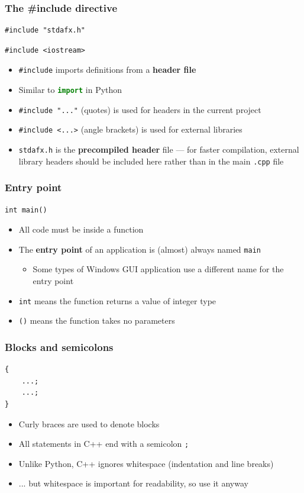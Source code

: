 \begin{frame}[fragile]
	\frametitle{The \#include directive}
	\begin{lstlisting}
#include "stdafx.h"
	\end{lstlisting}
	\begin{lstlisting}
#include <iostream>
	\end{lstlisting}
	\pause
	\begin{itemize}
		\item \lstinline{#include} imports definitions from a \textbf{header file} \pause
		\item Similar to \lstinline[language=Python]{import} in Python \pause
		\item \lstinline{#include "..."} (quotes) is used for headers in the current project \pause
		\item \lstinline{#include <...>} (angle brackets) is used for external libraries \pause
		\item \texttt{stdafx.h} is the \textbf{precompiled header} file --- for faster compilation, external library headers should be included here rather than in the main \texttt{.cpp} file
	\end{itemize}
\end{frame}

\begin{frame}[fragile]
	\frametitle{Entry point}
	\begin{lstlisting}
int main()
	\end{lstlisting}
	\pause
	\begin{itemize}
		\item All code must be inside a function \pause
		\item The \textbf{entry point} of an application is (almost) always named \lstinline{main} \pause
		\begin{itemize}
			\item Some types of Windows GUI application use a different name for the entry point \pause
		\end{itemize}
		\item \lstinline{int} means the function returns a value of integer type \pause
		\item \lstinline{()} means the function takes no parameters
	\end{itemize}
\end{frame}

\begin{frame}[fragile]
	\frametitle{Blocks and semicolons}
	\begin{lstlisting}
{
    ...;
    ...;
}
	\end{lstlisting}
	\pause
	\begin{itemize}
		\item Curly braces are used to denote blocks \pause
		\item All statements in C++ end with a semicolon \lstinline{;} \pause
		\item Unlike Python, C++ ignores whitespace (indentation and line breaks) \pause
		\item ... but whitespace is important for readability, so use it anyway
	\end{itemize}
\end{frame}

